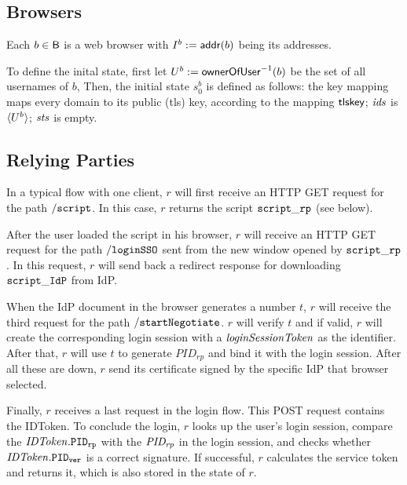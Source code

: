   \subsection{Browsers}\label{app:browsers-uppresso} 
  Each $b \in \mathsf{B}$ is a web browser with 
  $I^b := \mathsf{addr}(b)$ being its addresses.
  
  To define the inital state, first let $U^b := 
  \mathsf{ownerOfUser}^{-1}(b)$ be the set of all usernames of $b$, 
  Then, the initial state $s_0^b$ is defined as follows: the key mapping
  maps every domain to its public (tls) key, according to the mapping
  $\mathsf{tlskey}$;
  $\mathit{ids}$ is $\langle U^b\rangle$; $\mathit{sts}$ is empty.
  
  \subsection{Relying Parties} \label{app:relying-parties-uppresso}
   
  In a typical flow with one client, $r$ will first receive an HTTP GET
  request for the path $\mathtt{/script}$. In this case, $r$ returns the script
  $\mathtt{script\_rp}$ (see below).
  
  After the user loaded the script in his browser, $r$ will receive an 
  HTTP GET request for the path $\mathtt{/loginSSO}$ sent from the new window opened
  by $\mathtt{script\_rp}$. In this request, $r$ will send back a redirect response  
  for downloading $\mathtt{script\_IdP}$ from IdP.
  
  When the IdP document in the browser generates a number $t$,
  $r$ will receive the third request for the path $\mathtt{/startNegotiate}$.
  $r$ will verify $t$ and if valid, $r$ will create the corresponding 
  login session with a $\mathit{loginSessionToken}$ as the identifier. After that,
  $r$ will use $t$ to generate $PID_{rp}$ and bind it with the login session.
  After all these are down, $r$ send its certificate signed by the specific IdP that browser selected.
  
  Finally, $r$ receives a last request in the login flow. This POST request 
  contains the IDToken. To conclude the login, $r$ looks up the user's login session, 
  compare the $\mathit{IDToken}.\mathtt{PID_{rp}}$ with the $\mathit{PID_{rp}}$ in the login session, and checks 
  whether $\mathit{IDToken}.\mathtt{PID_{ver}}$ is a correct signature. If successful, $r$ calculates the 
  service token and returns it, which is also stored in the state of $r$.
  
